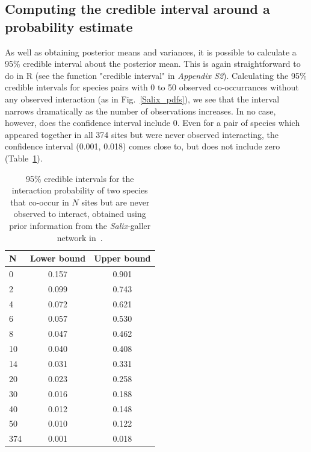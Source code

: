 \documentclass[12pt]{article}
\begin{document}
  \subsection*{Computing the credible interval around a probability estimate}

      As well as obtaining posterior means and variances, it is possible to calculate a 95\% credible interval about the posterior mean. This is again straightforward to do in R (see the function "credible interval" in \emph{Appendix S2}). Calculating the 95\% credible intervals for species pairs with 0 to 50 observed co-occurrances without any observed interaction (as in Fig.~\ref{Salix_pdfs}), we see that the interval narrows dramatically as the number of observations increases. In no case, however, does the confidence interval include 0. Even for a pair of species which appeared together in all 374 sites but were never observed interacting, the confidence interval (0.001, 0.018) comes close to, but does not include zero (Table~\ref{interval_table}). 


      \begin{table}[h]
        \caption{95\% credible intervals for the interaction probability of two species that co-occur in $N$ sites but are never observed to interact, obtained using prior information from the \emph{Salix}-galler network in~\citet{Barbour2016,Barbour2016Dryad}.}
        \label{interval_table}
        \begin{tabular}{l | c c}
        N & Lower bound & Upper bound \\
        \hline
        0   & 0.157 & 0.901 \\
        2   & 0.099 & 0.743 \\
        4   & 0.072 & 0.621 \\
        6   & 0.057 & 0.530 \\
        8   & 0.047 & 0.462 \\
        10 & 0.040 & 0.408 \\
        14 & 0.031 & 0.331 \\
        20 & 0.023 & 0.258 \\
        30 & 0.016 & 0.188 \\
        40 & 0.012 & 0.148 \\
        50 & 0.010 & 0.122 \\
        \hline
        374 & 0.001 & 0.018 \\
        \hline
        \end{tabular}
        \end{table}
\end{document}
